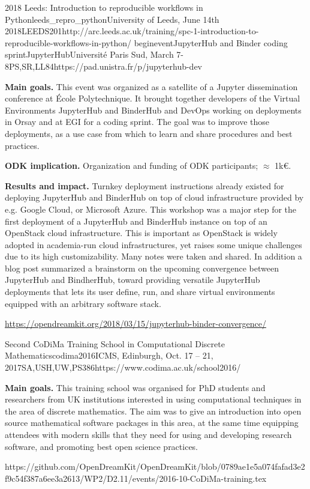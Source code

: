 \begin{Aim 1}
\begin{Aim 2}
\begin{event}{2018 Leeds: Introduction to reproducible workflows in Python}{leeds_repro_python}{University of Leeds, June 14th 2018}{LEEDS}{20}{1}{http://arc.leeds.ac.uk/training/spc-1-introduction-to-reproducible-workflows-in-python/}
begin{event}{JupyterHub and Binder coding sprint}{JupyterHub}{Université Paris Sud, March 7-8}{PS,SR,LL}{8}{4}{https://pad.unistra.fr/p/jupyterhub-dev}

  \textbf{Main goals.} This event was organized as a satellite of a
  Jupyter dissemination conference at École Polytechnique. It brought
  together developers of the Virtual Environments JupyterHub and
  BinderHub and DevOps working on deployments in Orsay and at EGI for
  a coding sprint. The goal was to improve those deployments, as a use
  case from which to learn and share procedures and best practices.

  \textbf{ODK implication.} Organization and funding of ODK participants; $\approx$ 1k\euro.

  \textbf{Results and impact.} Turnkey deployment instructions already
  existed for deploying JupyterHub and BinderHub on top of cloud
  infrastructure provided by e.g. Google Cloud, or Microsoft Azure.
  This workshop was a major step for the first deployment of a
  JupyterHub and BinderHub instance on top of an OpenStack cloud
  infrastructure. This is important as OpenStack is widely adopted in
  academia-run cloud infrastructures, yet raises some unique
  challenges due to its high customizability. Many notes were taken
  and shared. In addition a blog post summarized a brainstorm on the
  upcoming convergence between JupyterHub and BindherHub, toward
  providing versatile JupyterHub deployments that lets its user
  define, run, and share virtual environments equipped with an
  arbitrary software stack.

  \url{https://opendreamkit.org/2018/03/15/jupyterhub-binder-convergence/}
\end{event}

\begin{event}{Second CoDiMa Training School in Computational Discrete Mathematics}{codima2016}{ICMS, Edinburgh, Oct. 17 -- 21, 2017}{SA,USH,UW,PS}{38}{6}{https://www.codima.ac.uk/school2016/}

\textbf{Main goals.} This training school was organised for PhD students and researchers from
UK institutions interested in using computational techniques in the area of discrete mathematics.
The aim was to give an introduction into open source mathematical software packages in this area,
at the same time equipping attendees with modern skills that they need for using and developing
research software, and promoting best open science practices.

https://github.com/OpenDreamKit/OpenDreamKit/blob/0789ae1e5a074fafad3e2f9c54f387a6ee3a2613/WP2/D2.11/events/2016-10-CoDiMa-training.tex



\end{event}
\end{Aim 2}
\end{Aim 1}
